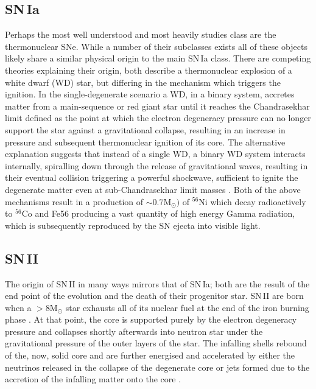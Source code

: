 \subsection{SN\,Ia}
Perhaps the most well understood and most heavily studies class are the thermonuclear SNe. While a number of their subclasses exists \citep[amongst others: SN\,.Ia, SN\'Iax, SN\,Ia-91T, SN\,Ia-91bg][]{Alsabti2017} all of these objects likely share a similar physical origin to the main SN\,Ia class. There are competing theories explaining their origin, both describe a thermonuclear explosion of a white dwarf (WD) star, but differing in the mechanism which triggers the ignition. In the single-degenerate scenario \citep{Whelan1973} a WD, in a binary system, accretes matter from a main-sequence or red giant star until it reaches the Chandrasekhar limit defined as the point at which the electron degeneracy pressure can no longer support the star against a gravitational collapse, resulting in an increase in pressure and subsequent thermonuclear ignition of its core. The alternative explanation suggests that instead of a single WD, a binary WD system interacts internally, spiralling down through the release of gravitational waves, resulting in their eventual collision triggering a powerful shockwave, sufficient to ignite the degenerate matter even at sub-Chandrasekhar limit masses \citep{Iben1984}. Both of the above mechanisms result in a production of $\sim$0.7M$_\odot)$ of $^{56}$Ni \citep{Scalzo2014} which decay radioactively to $^{56}$Co and Fe56 producing a vast quantity of high energy Gamma radiation, which is subsequently reproduced by the SN ejecta into visible light.

\subsection{SN\,II}
The origin of SN\,II in many ways mirrors that of SN\,Ia; both are the result of the end point of the evolution and the death of their progenitor star. SN\,II are born when a $>$8M$_\odot$ star exhausts all of its nuclear fuel at the end of the iron burning phase \citep{Clayton1983}. At that point, the core is supported purely by the electron degeneracy pressure and collapses shortly afterwards into neutron star under the gravitational pressure of the outer layers of the star. The infalling shells rebound of the, now, solid core and are further energised and accelerated by either the neutrinos released in the collapse of the degenerate core \citep{Burrows1987} or jets formed due to the accretion of the infalling matter onto the core \citep{Khokhlov1999,Burrows2007}.

